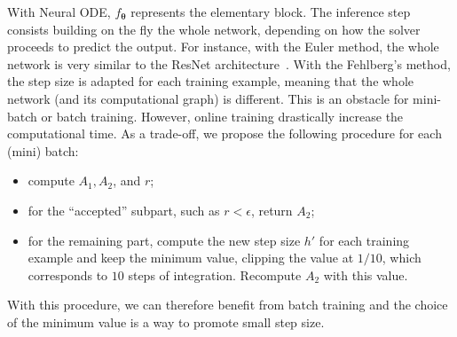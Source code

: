 \documentclass{article}
\newcommand{\eps}{\ensuremath{\epsilon}}
\newcommand{\params}{\ensuremath{\boldsymbol{\theta}}}
\newcommand{\nnet}{\ensuremath{f_{\params}}}
\begin{document}
With Neural ODE, $\nnet$ represents the elementary block. The
inference step consists building on the fly the whole network,
depending on how the solver proceeds to predict the output. For
instance, with the Euler method, the whole network is very similar to
the ResNet architecture~\cite{He16Deep,Haber17Stable,Lu18Beyond}.
With the Fehlberg's method, the step size is adapted for each training
example, meaning that the whole network (and its computational graph)
is different. This is an obstacle for mini-batch or batch training.
However, online training drastically increase the computational time.
As a trade-off, we propose the following procedure for each (mini)
batch:
\begin{itemize}
\item compute $A_1, A_2$, and $r$;
\item for the  ``accepted'' subpart, such as $r<\eps$,  return $A_2$;
\item for the remaining part, compute the new step size $h'$ for each
  training example and keep the minimum value, clipping the value at
  $1/10$, which corresponds to $10$ steps of integration. Recompute
  $A_2$ with this value.
\end{itemize}
With this procedure, we can therefore benefit from batch training and
the choice of the minimum value is a way to promote small step size.
\end{document}
